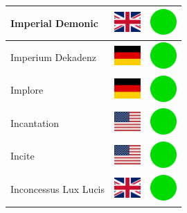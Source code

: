 \documentclass[12pt, a4paper, twoside]{report}
\begin{document}
\begin{center}
\begin{longtable}{|p{5cm}|p{2cm}|p{2cm}|}
 Imperial Demonic                                           & \includegraphics[width=1cm]{../img/flags/gb} &   \includegraphics[width=1cm]{../likes/y} \\ \hline
 Imperium Dekadenz                                          & \includegraphics[width=1cm]{../img/flags/de} &   \includegraphics[width=1cm]{../likes/y} \\ \hline
 Implore                                                    & \includegraphics[width=1cm]{../img/flags/de} &   \includegraphics[width=1cm]{../likes/y} \\ \hline
 Incantation                                                & \includegraphics[width=1cm]{../img/flags/us} &   \includegraphics[width=1cm]{../likes/y} \\ \hline
 Incite                                                     & \includegraphics[width=1cm]{../img/flags/us} &   \includegraphics[width=1cm]{../likes/y} \\ \hline
 Inconcessus Lux Lucis                                      & \includegraphics[width=1cm]{../img/flags/gb} &   \includegraphics[width=1cm]{../likes/y} \\ \hline

\end{longtable}
\end{center}
\end{document}
